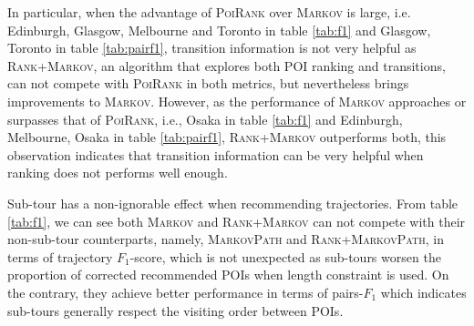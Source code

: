 In particular, when the advantage of \textsc{PoiRank} over \textsc{Markov} is large, 
i.e. Edinburgh, Glasgow, Melbourne and Toronto in table \ref{tab:f1} and Glasgow, Toronto in table \ref{tab:pairf1},
transition information is not very helpful as \textsc{Rank+Markov}, an algorithm that explores both POI ranking and transitions,
can not compete with \textsc{PoiRank} in both metrics, but nevertheless brings improvements to \textsc{Markov}.
However, as the performance of \textsc{Markov} approaches or surpasses that of \textsc{PoiRank}, 
i.e., Osaka in table \ref{tab:f1} and Edinburgh, Melbourne, Osaka in table \ref{tab:pairf1},
\textsc{Rank+Markov} outperforms both, this observation indicates that transition information can be very helpful when 
ranking does not performs well enough.

Sub-tour has a non-ignorable effect when recommending trajectories.
From table \ref{tab:f1}, we can see both \textsc{Markov} and \textsc{Rank+Markov} can not compete with
their non-sub-tour counterparts, namely, \textsc{MarkovPath} and \textsc{Rank+MarkovPath}, 
in terms of trajectory $F_1$-score, which is not unexpected as sub-tours worsen the proportion of corrected
recommended POIs when length constraint is used.
On the contrary, they achieve better performance in terms of pairs-$F_1$ which indicates sub-tours generally 
respect the visiting order between POIs.
 
